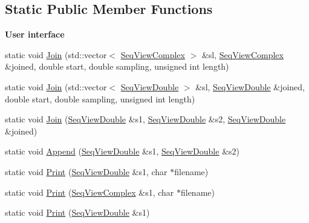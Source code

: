 \subsection*{Static Public Member Functions}
\begin{Indent}\textbf{ User interface}\par
\begin{DoxyCompactItemize}
\item 
static void \hyperlink{classtsa_1_1_view_util_a1d1f00f3a3ae89b3ddef911bf9835049}{Join} (std\+::vector$<$ \hyperlink{namespacetsa_ab32775c889b53c40fa83939f22372b75}{Seq\+View\+Complex} $>$ \&sl, \hyperlink{namespacetsa_ab32775c889b53c40fa83939f22372b75}{Seq\+View\+Complex} \&joined, double start, double sampling, unsigned int length)
\item 
static void \hyperlink{classtsa_1_1_view_util_ad8728d95442741e7dd5f3d74cc917c0c}{Join} (std\+::vector$<$ \hyperlink{namespacetsa_ac599574bcc094eda25613724b8f3ca9e}{Seq\+View\+Double} $>$ \&sl, \hyperlink{namespacetsa_ac599574bcc094eda25613724b8f3ca9e}{Seq\+View\+Double} \&joined, double start, double sampling, unsigned int length)
\item 
static void \hyperlink{classtsa_1_1_view_util_a0f75acac9a11c4eaeda04d5256fad5ed}{Join} (\hyperlink{namespacetsa_ac599574bcc094eda25613724b8f3ca9e}{Seq\+View\+Double} \&s1, \hyperlink{namespacetsa_ac599574bcc094eda25613724b8f3ca9e}{Seq\+View\+Double} \&s2, \hyperlink{namespacetsa_ac599574bcc094eda25613724b8f3ca9e}{Seq\+View\+Double} \&joined)
\item 
static void \hyperlink{classtsa_1_1_view_util_aef8807df1cb1fd091da9b13242a7f273}{Append} (\hyperlink{namespacetsa_ac599574bcc094eda25613724b8f3ca9e}{Seq\+View\+Double} \&s1, \hyperlink{namespacetsa_ac599574bcc094eda25613724b8f3ca9e}{Seq\+View\+Double} \&s2)
\item 
static void \hyperlink{classtsa_1_1_view_util_a164858cf99bb21da58de6f7c34400a09}{Print} (\hyperlink{namespacetsa_ac599574bcc094eda25613724b8f3ca9e}{Seq\+View\+Double} \&s1, char $\ast$filename)
\item 
static void \hyperlink{classtsa_1_1_view_util_a9669abbb59a08c0b36cdee2b478f5c95}{Print} (\hyperlink{namespacetsa_ab32775c889b53c40fa83939f22372b75}{Seq\+View\+Complex} \&s1, char $\ast$filename)
\item 
static void \hyperlink{classtsa_1_1_view_util_aae610aa81fa557062de40594c246f54e}{Print} (\hyperlink{namespacetsa_ac599574bcc094eda25613724b8f3ca9e}{Seq\+View\+Double} \&s1)
\item 

\end{DoxyCompactItemize}
\end{Indent}
